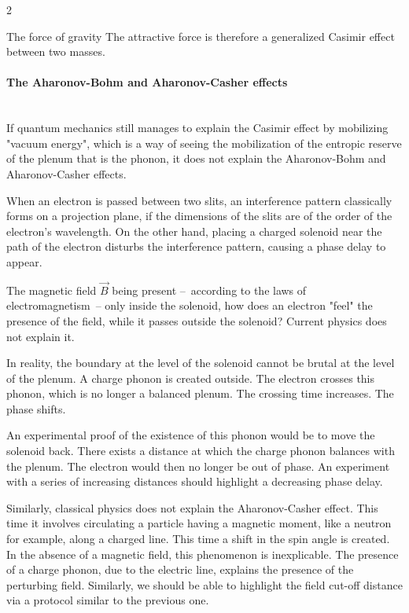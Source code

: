 \begin{multicols}{2}
	\begin{mybox}[breakable,colback=blue!10, colbacktitle=pkcolor]{The force of gravity}
		The attractive force is therefore a generalized Casimir effect between two 
		masses.
	\end{mybox}
	\medskip
	
	
	\paragraph{The Aharonov-Bohm and Aharonov-Casher effects}~\\
	
	
	If quantum mechanics still manages to explain the Casimir effect by 
	mobilizing "vacuum energy", which is a way of seeing the mobilization of 
	the entropic reserve of the plenum that is the phonon, it does not 
	explain the Aharonov-Bohm and Aharonov-Casher effects.
	
	When an electron is passed between two slits, an interference pattern 
	classically forms on a projection plane, if the dimensions of the slits 
	are of the order of the electron's wavelength. On the other hand, 
	placing a charged solenoid near the path of the electron disturbs the 
	interference pattern, causing a phase delay to appear.
	
	The magnetic field $\vec B$ being present --~according to the laws of 
	electromagnetism~-- only inside the solenoid, how does an electron 
	"feel" the presence of the field, while it passes outside the solenoid? 
	Current physics does not explain it.
	
	In reality, the boundary at the level of the solenoid cannot be brutal at 
	the level of the plenum. A charge phonon is created outside. The 
	electron crosses this phonon, which is no longer a balanced plenum. 
	The crossing time increases. The phase shifts.
	
	An experimental proof of the existence of this phonon would be to move the 
	solenoid back. There exists a distance at which the charge phonon 
	balances with the plenum. The electron would then no longer be 
	out of phase. An experiment with a series of increasing distances 
	should highlight a decreasing phase delay.
	
	Similarly, classical physics does not explain the Aharonov-Casher effect. 
	This time it involves circulating a particle having a magnetic moment, 
	like a neutron for example, along a charged line. This time a shift in 
	the spin angle is created. In the absence of a magnetic field, this 
	phenomenon is inexplicable. The presence of a charge phonon, due to the 
	electric line, explains the presence of the perturbing field. 
	Similarly, we should be able to highlight the field cut-off distance 
	via a protocol similar to the previous one.
	

\end{multicols}
